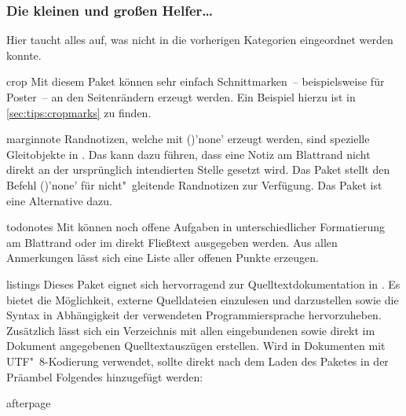 \subsubsection{Die kleinen und großen Helfer\dots}
Hier taucht alles auf, was nicht in die vorherigen Kategorien eingeordnet 
werden konnte.
%
\begin{packages}
\item[crop]
  Mit diesem Paket können sehr einfach Schnittmarken~-- beispielsweise für 
  Poster~-- an den Seitenrändern erzeugt werden. Ein Beispiel hierzu ist in 
  \autoref{sec:tips:cropmarks} zu finden.
\item[marginnote]
  Randnotizen, welche mit ()'none' erzeugt
  werden, sind spezielle Gleitobjekte in . Das kann dazu führen, 
  dass eine Notiz am Blattrand nicht direkt an der ursprünglich intendierten 
  Stelle gesetzt wird. Das Paket  stellt den Befehl 
  ()'none' für nicht"~gleitende 
  Randnotizen zur Verfügung. Das Paket  ist eine Alternative 
  dazu.
\item[todonotes]
  Mit  können noch offene Aufgaben in unterschiedlicher 
  Formatierung am Blattrand oder im direkt Fließtext ausgegeben werden. Aus 
  allen Anmerkungen lässt sich eine Liste aller offenen Punkte erzeugen.
\item[listings]
  Dieses Paket eignet sich hervorragend zur Quelltextdokumentation in 
  . Es bietet die Möglichkeit, externe Quelldateien einzulesen 
  und darzustellen sowie die Syntax in Abhängigkeit der verwendeten 
  Programmiersprache hervorzuheben. Zusätzlich lässt sich ein Verzeichnis mit 
  allen eingebundenen sowie direkt im Dokument angegebenen Quelltextauszügen 
  erstellen.
  Wird  in Dokumenten mit UTF"~8-Kodierung verwendet, sollte 
  direkt nach dem Laden des Paketes in der Präambel Folgendes hinzugefügt 
  werden:
  \begin{Code}
  \end{Code}\vspace{-\baselineskip}%
\item[afterpage]

\end{packages}
